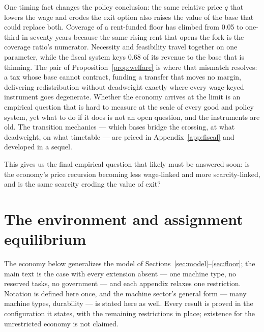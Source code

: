 \documentclass[12pt]{article}
\theoremstyle{plain}
\begin{document}
One timing fact changes the policy conclusion: the same relative price $q$ that lowers the wage and erodes the exit option also raises the value of the base that could replace both. Coverage of a rent-funded floor has climbed from 0.05 to one-third in seventy years because the same rising rent that opens the fork is the coverage ratio's numerator. Necessity and feasibility travel together on one parameter, while the fiscal system keys 0.68 of its revenue to the base that is thinning. The pair of Proposition~\ref{prop:welfare} is where that mismatch resolves: a tax whose base cannot contract, funding a transfer that moves no margin, delivering redistribution without deadweight exactly where every wage-keyed instrument goes degenerate. Whether the economy arrives at the limit is an empirical question that is hard to measure at the scale of every good and policy system, yet what to do if it does is not an open question, and the instruments are old. The transition mechanics --- which bases bridge the crossing, at what deadweight, on what timetable --- are priced in Appendix~\ref{app:fiscal} and developed in a sequel.

This gives us the final empirical question that likely must be answered soon: is the economy's price recursion becoming less wage-linked and more scarcity-linked, and is the same scarcity eroding the value of exit?

\appendix
{}

\section{The environment and assignment equilibrium}\label{app:environment}

The economy below generalizes the model of Sections~\ref{sec:model}--\ref{sec:floor}; the main text is the case with every extension absent --- one machine type, no reserved tasks, no government --- and each appendix relaxes one restriction. Notation is defined here once, and the machine sector's general form --- many machine types, durability --- is stated here as well. Every result is proved in the configuration it states, with the remaining restrictions in place; existence for the unrestricted economy is not claimed.
\end{document}
